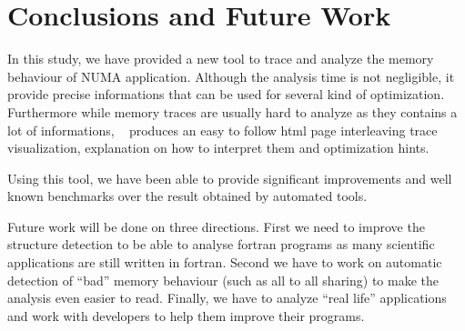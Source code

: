 
\section{Conclusions and Future Work}
\label{sec:concl}


In this study, we have provided a new tool to trace and analyze the memory
behaviour of NUMA application. Although the analysis time is not negligible,
it provide precise informations that can be used for several kind of
optimization. Furthermore while memory traces are usually hard to analyze as
they contains a lot of informations, \TABARNAC~ produces an easy to follow
html page interleaving trace visualization, explanation on how to interpret
them and optimization hints.

Using this tool, we have been able to provide significant improvements and
well known benchmarks over the result obtained by automated tools.

Future work will be done on three directions. First we need to improve the
structure detection to be able to analyse fortran programs as many
scientific applications are still written in fortran. Second we have to work
on automatic detection of ``bad'' memory behaviour (such as all to all sharing)
to make the analysis even easier to read. Finally, we have to analyze ``real
life'' applications and work with developers to help them improve their
programs.

